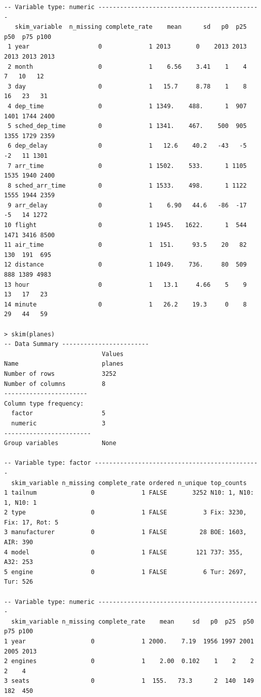 \documentclass[12pt]{article}
\begin{document}
\begin{enumerate}[(a)]
\begin{Verbatim}[fontsize=\small]
-- Variable type: numeric ---------------------------------------------
   skim_variable  n_missing complete_rate    mean      sd   p0  p25  p50  p75 p100
 1 year                   0             1 2013       0    2013 2013 2013 2013 2013
 2 month                  0             1    6.56    3.41    1    4    7   10   12
 3 day                    0             1   15.7     8.78    1    8   16   23   31
 4 dep_time               0             1 1349.    488.      1  907 1401 1744 2400
 5 sched_dep_time         0             1 1341.    467.    500  905 1355 1729 2359
 6 dep_delay              0             1   12.6    40.2   -43   -5   -2   11 1301
 7 arr_time               0             1 1502.    533.      1 1105 1535 1940 2400
 8 sched_arr_time         0             1 1533.    498.      1 1122 1555 1944 2359
 9 arr_delay              0             1    6.90   44.6   -86  -17   -5   14 1272
10 flight                 0             1 1945.   1622.      1  544 1471 3416 8500
11 air_time               0             1  151.     93.5    20   82  130  191  695
12 distance               0             1 1049.    736.     80  509  888 1389 4983
13 hour                   0             1   13.1     4.66    5    9   13   17   23
14 minute                 0             1   26.2    19.3     0    8   29   44   59

> skim(planes)
-- Data Summary ------------------------
                           Values
Name                       planes
Number of rows             3252  
Number of columns          8     
-----------------------          
Column type frequency:           
  factor                   5     
  numeric                  3     
------------------------         
Group variables            None  

-- Variable type: factor ----------------------------------------------
  skim_variable n_missing complete_rate ordered n_unique top_counts                             
1 tailnum               0             1 FALSE       3252 N10: 1, N10: 1, N10: 1  
2 type                  0             1 FALSE          3 Fix: 3230, Fix: 17, Rot: 5             
3 manufacturer          0             1 FALSE         28 BOE: 1603, AIR: 390
4 model                 0             1 FALSE        121 737: 355, A32: 253
5 engine                0             1 FALSE          6 Tur: 2697, Tur: 526

-- Variable type: numeric ---------------------------------------------
  skim_variable n_missing complete_rate    mean     sd   p0  p25  p50  p75 p100
1 year                  0             1 2000.    7.19  1956 1997 2001 2005 2013
2 engines               0             1    2.00  0.102    1    2    2    2    4
3 seats                 0             1  155.   73.3      2  140  149  182  450
\end{Verbatim}


\end{enumerate}
\end{document}
